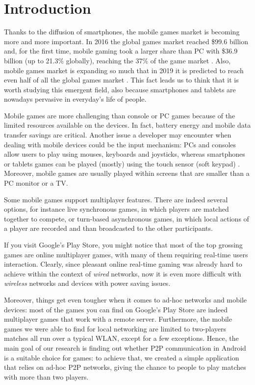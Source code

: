 \section{Introduction}
Thanks to the diffusion of smartphones, the mobile games market is becoming
more and more important. In 2016 the global games market reached \$99.6
billion and, for the first time, mobile gaming took a larger share than PC
with \$36.9 billion (up to 21.3\% globally), reaching the 37\% of the game
market \cite{bib:newzoo2}. Also, mobile games market is expanding so much that
in 2019 it is predicted to reach even half of all the global games market
\cite{bib:newzoo}. This fact leads us to think that it is worth studying
this emergent field, also because smartphones and tablets are nowadays
pervasive in everyday's life of people.

Mobile games are more challenging than console or PC games because of the
limited resources available on the devices. In fact, battery energy and
mobile data transfer savings are critical. Another issue a developer may
encounter when dealing with mobile devices could be the input mechanism:
PCs and consoles allow users to play using mouses, keyboards and joysticks,
whereas smartphones or tablets games can be played (mostly) using the
touch sensor (soft keypad) \cite{bib:mobile-input-devices}. Moreover, mobile
games are usually played within screens that are smaller than a PC monitor or a
TV.

Some mobile games support multiplayer features. There are indeed several
options, for instance live synchronous games, in which players are matched
together to compete, or turn-based asynchronous games, in which local actions
of a player are recorded and than broadcasted to the other participants.

If you visit Google's Play Store, you might notice that most of the top
grossing games are online multiplayer games, with many of them requiring
real-time users interaction. Clearly, since pleasant online real-time gaming
was already hard to achieve within the context of \textit{wired} networks, now
it is even more difficult with \textit{wireless} networks and devices with
power saving issues.

Moreover, things get even tougher when it comes to ad-hoc networks and mobile
devices: most of the games you can find on Google's Play Store are indeed
multiplayer games that work with a remote server. Furthermore, the mobile
games we were able to find for local networking are limited to two-players
matches all run over a typical WLAN, except for a few exceptions. Hence, the
main goal of our research is finding out whether P2P \wifi{} communication in
Android is a suitable choice for games: to achieve that, we created a simple
application that relies on ad-hoc P2P networks, giving the chance to people to
play matches with more than two players.

